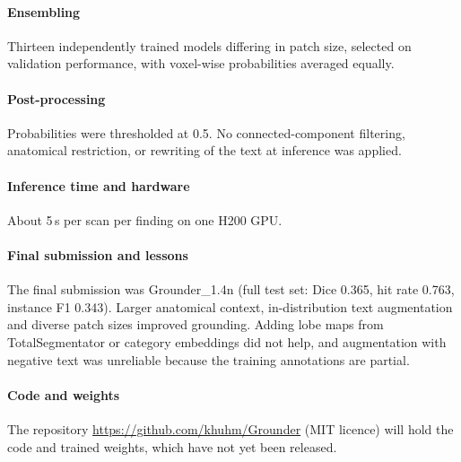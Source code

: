 \paragraph{Ensembling} Thirteen independently trained models differing in patch
size, selected on validation performance, with voxel-wise probabilities averaged
equally.

\paragraph{Post-processing} Probabilities were thresholded at 0.5. No
connected-component filtering, anatomical restriction, or rewriting of the text
at inference was applied.

\paragraph{Inference time and hardware} About 5\,s per scan per finding on one
H200 GPU.

\paragraph{Final submission and lessons} The final submission was
Grounder\_1.4n (full test set: Dice 0.365, hit rate 0.763, instance
F1 0.343). Larger anatomical context, in-distribution text augmentation
and diverse patch sizes improved grounding. Adding lobe maps from
TotalSegmentator \citep{wasserthal2023totalsegmentator} or category embeddings
did not help, and augmentation with negative text was unreliable because the
training annotations are partial.

\paragraph{Code and weights} The repository \url{https://github.com/khuhm/Grounder}
(MIT licence) will hold the code and trained weights, which have not yet been
released.
